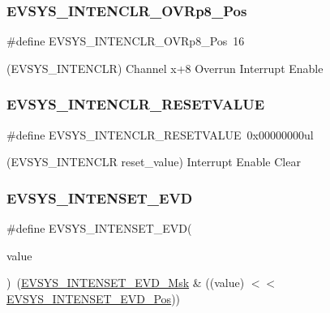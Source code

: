 \subsubsection{\texorpdfstring{EVSYS\_INTENCLR\_OVRp8\_Pos}{EVSYS\_INTENCLR\_OVRp8\_Pos}}
{\footnotesize\ttfamily \#define E\+V\+S\+Y\+S\+\_\+\+I\+N\+T\+E\+N\+C\+L\+R\+\_\+\+O\+V\+Rp8\+\_\+\+Pos~16}



(E\+V\+S\+Y\+S\+\_\+\+I\+N\+T\+E\+N\+C\+LR) Channel x+8 Overrun Interrupt Enable 

\mbox{\label{group___s_a_m_d21___e_v_s_y_s_gafb4ee0d51bdb48835ff631cb56a93534}} 
\subsubsection{\texorpdfstring{EVSYS\_INTENCLR\_RESETVALUE}{EVSYS\_INTENCLR\_RESETVALUE}}
{\footnotesize\ttfamily \#define E\+V\+S\+Y\+S\+\_\+\+I\+N\+T\+E\+N\+C\+L\+R\+\_\+\+R\+E\+S\+E\+T\+V\+A\+L\+UE~0x00000000ul}



(E\+V\+S\+Y\+S\+\_\+\+I\+N\+T\+E\+N\+C\+LR reset\+\_\+value) Interrupt Enable Clear 

\mbox{\label{group___s_a_m_d21___e_v_s_y_s_ga0830117798f7624f0e050988614b0bf9}} 
\subsubsection{\texorpdfstring{EVSYS\_INTENSET\_EVD}{EVSYS\_INTENSET\_EVD}}
{\footnotesize\ttfamily \#define E\+V\+S\+Y\+S\+\_\+\+I\+N\+T\+E\+N\+S\+E\+T\+\_\+\+E\+VD(\begin{DoxyParamCaption}\item[{}]{value }\end{DoxyParamCaption})~(\mbox{\hyperlink{group___s_a_m_d21___e_v_s_y_s_gae62892a13725d99783475ce3b4bfb043}{E\+V\+S\+Y\+S\+\_\+\+I\+N\+T\+E\+N\+S\+E\+T\+\_\+\+E\+V\+D\+\_\+\+Msk}} \& ((value) $<$$<$ \mbox{\hyperlink{group___s_a_m_d21___e_v_s_y_s_ga0b9e0e6564aadc19f81955941877a3a7}{E\+V\+S\+Y\+S\+\_\+\+I\+N\+T\+E\+N\+S\+E\+T\+\_\+\+E\+V\+D\+\_\+\+Pos}}))}

